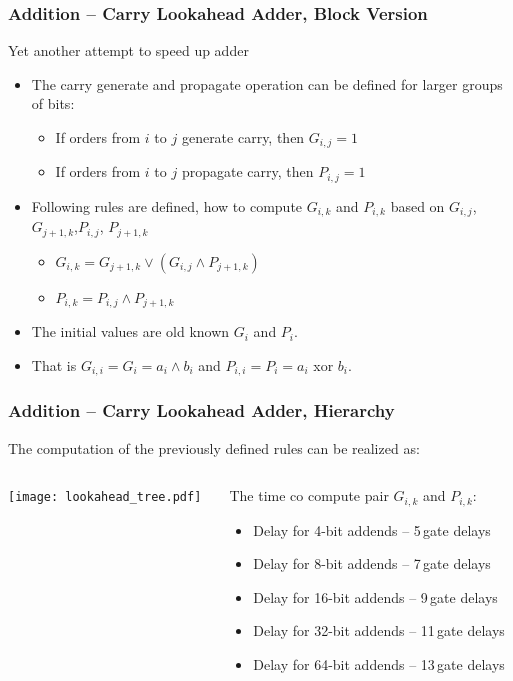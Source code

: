 \documentclass{beamer}
\begin{document}
\begin{frame}
\frametitle{Addition -- Carry Lookahead Adder, Block Version}

Yet another attempt to speed up adder
\begin{itemize}
\item The carry generate and propagate operation can be defined for larger groups of bits:
\begin{itemize}
\item If orders from $i$ to $j$ generate carry, then $G_{i,j}=1$
\item If orders from $i$ to $j$ propagate carry, then $P_{i,j}=1$
\end{itemize}
\item Following rules are defined, how to compute $G_{i,k}$ and $P_{i,k}$ based on $G_{i,j}$, $G_{j+1,k}$,$P_{i,j}$, $P_{j+1,k}$
\begin{itemize}
\item $G_{i,k}=G_{j+1,k} \lor (G_{i,j} \land P_{j+1,k})$
\item $P_{i,k}=P_{i,j} \land P_{j+1,k}$
\end{itemize}
\item The initial values are old known $G_i$ and $P_i$. 
\item That is $G_{i,i}=G_i=a_i \land b_i$ and $P_{i,i}=P_i=a_i$ xor $b_i$.
\end{itemize}

\end{frame}

\begin{frame}
\frametitle{Addition -- Carry Lookahead Adder, Hierarchy}

The computation of the previously defined rules can be realized as:
\begin{columns}
\begin{column}{0.55\textwidth}
\begin{center}
   \texttt{[image: lookahead\_tree.pdf]}
\end{center}
\end{column}
\begin{column}{0.45\textwidth}

The time co compute pair $G_{i,k}$ and $P_{i,k}$:
\begin{itemize}
\item Delay for 4-bit addends -- 5\,gate delays
\item Delay for 8-bit addends -- 7\,gate delays
\item Delay for 16-bit addends -- 9\,gate delays
\item Delay for 32-bit addends -- 11\,gate delays
\item Delay for 64-bit addends -- 13\,gate delays
\end{itemize}

\end{column}
\end{columns}

\end{frame}
\end{document}
